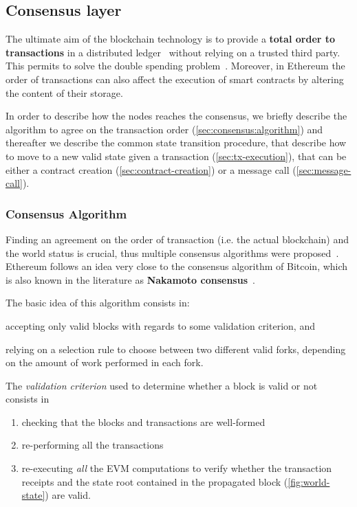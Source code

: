 \subsection{Consensus layer}
\label{sec:consensus}

The ultimate aim of the blockchain technology is to provide a \textbf{total
order to transactions} in a distributed ledger~\cite{bib:the-quest} without
relying on a trusted third party. This permits to solve the double spending
problem~\cite{bib:bitcoin}. Moreover, in Ethereum the order of transactions can
also affect the execution of smart contracts by altering the content of their
storage.

In order to describe how the nodes reaches the consensus, we briefly describe
the algorithm to agree on the transaction order
(\autoref{sec:consensus:algorithm}) and thereafter we describe the common state
transition procedure, that describe how to move to a new valid state given a
transaction (\autoref{sec:tx-execution}), that can be either a contract creation
(\autoref{sec:contract-creation}) or a message call
(\autoref{sec:message-call}).


\subsubsection{Consensus Algorithm}
\label{sec:consensus:algorithm}

Finding an agreement on the order of transaction (i.e. the actual blockchain)
and the world status is crucial, thus multiple consensus algorithms were
proposed~\cite{bib:the-quest}. Ethereum follows an idea very close to the
consensus algorithm of Bitcoin, which is also known in the literature as
\textbf{Nakamoto consensus}~\cite{bib:bitcoin-ng}.

The basic idea of this algorithm consists in:
\begin{enumerate*}[label=(\arabic*)]
	\item accepting only valid blocks with regards to some validation criterion,
	and
	\item relying on a selection rule to choose between two different
	valid forks, depending on the amount of work performed in each fork.
\end{enumerate*}

The \emph{validation criterion} used to determine whether a block is valid or
not consists in
\begin{enumerate}
	\item checking that the blocks and transactions are well-formed
	\item re-performing all the transactions
	\item re-executing \emph{all}	the EVM computations to verify whether the
	transaction receipts and the state root contained in the propagated block
	(\autoref{fig:world-state}) are valid.
\end{enumerate}


